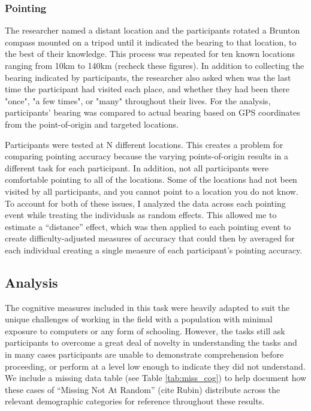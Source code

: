 		
		\subsubsection{Pointing}
		\label{sec:2.2.4}
The researcher named a distant location and the participants rotated a Brunton compass mounted on a tripod until it indicated the bearing to that location, to the best of their knowledge.  This process was repeated for ten known locations ranging from 10km to 140km (recheck these figures).  In addition to collecting the bearing indicated by participants, the researcher also asked when was the last time the participant had visited each place, and whether they had been there "once", "a few times", or "many" throughout their lives.  For the analysis, participants' bearing was compared to actual bearing based on GPS coordinates from the point-of-origin and targeted locations.   		

Participants were tested at N different locations.  This creates a problem for comparing pointing accuracy because the varying points-of-origin results in a different task for each participant.  In addition, not all participants were comfortable pointing to all of the locations.  Some of the locations had not been visited by all participants, and you cannot point to a location you do not know.  To account for both of these issues, I analyzed the data across each pointing event while treating the individuals as random effects.  This allowed me to estimate a ``distance'' effect, which was then applied to each pointing event to create difficulty-adjusted measures of accuracy that could then by averaged for each individual creating a single measure of each participant's pointing accuracy. 		
			

	\subsection{Analysis}
	\label{sec:2.2}

The cognitive measures included in this task were heavily adapted to suit the unique challenges of working in the field with a population with minimal exposure to computers or any form of schooling.  However, the tasks still ask participants to overcome a great deal of novelty in understanding the tasks and in many cases participants are unable to demonstrate comprehension before proceeding, or perform at a level low enough to indicate they did not understand.  We include a missing data table (see Table \ref{tab:miss_cog})	to help document how these cases of ``Missing Not At Random'' (cite Rubin) distribute across the relevant demographic categories for reference throughout these results.

